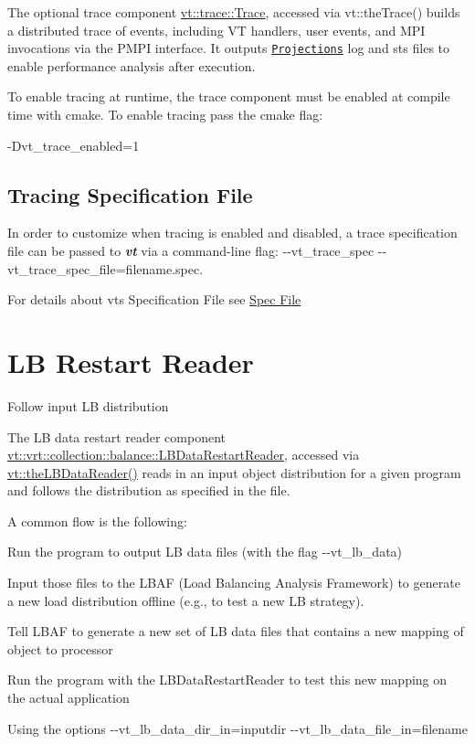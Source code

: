 The optional trace component {\ttfamily \hyperlink{structvt_1_1trace_1_1_trace}{vt\+::trace\+::\+Trace}}, accessed via {\ttfamily vt\+::the\+Trace()} builds a distributed trace of events, including VT handlers, user events, and M\+PI invocations via the P\+M\+PI interface. It outputs \href{http://charm.cs.uiuc.edu/software}{\tt Projections} log and sts files to enable performance analysis after execution.

To enable tracing at runtime, the trace component must be enabled at compile time with cmake. To enable tracing pass the cmake flag\+: 
\begin{DoxyCode}
-Dvt\_trace\_enabled=1
\end{DoxyCode}
\hypertarget{trace_tracing-spec-file}{}\subsection{Tracing Specification File}\label{trace_tracing-spec-file}
In order to customize when tracing is enabled and disabled, a trace specification file can be passed to {\bfseries {\itshape vt}} via a command-\/line flag\+: {\ttfamily -\/-\/vt\+\_\+trace\+\_\+spec -\/-\/vt\+\_\+trace\+\_\+spec\+\_\+file=filename.\+spec}.

For details about vt\textquotesingle{}s Specification File see \hyperlink{spec-file}{Spec File} \hypertarget{lb-data-reader}{}\section{LB Restart Reader}\label{lb-data-reader}
Follow input LB distribution

The LB data restart reader component {\ttfamily \hyperlink{structvt_1_1vrt_1_1collection_1_1balance_1_1_l_b_data_restart_reader}{vt\+::vrt\+::collection\+::balance\+::\+L\+B\+Data\+Restart\+Reader}}, accessed via {\ttfamily \hyperlink{namespacevt_a6dc000b04e41df77184588b50280b312}{vt\+::the\+L\+B\+Data\+Reader()}} reads in an input object distribution for a given program and follows the distribution as specified in the file.

A common flow is the following\+:
\begin{DoxyItemize}
\item Run the program to output LB data files (with the flag {\ttfamily -\/-\/vt\+\_\+lb\+\_\+data})
\item Input those files to the L\+B\+AF (Load Balancing Analysis Framework) to generate a new load distribution offline (e.\+g., to test a new LB strategy).
\begin{DoxyItemize}
\item Tell L\+B\+AF to generate a new set of LB data files that contains a new mapping of object to processor
\end{DoxyItemize}
\item Run the program with the {\ttfamily L\+B\+Data\+Restart\+Reader} to test this new mapping on the actual application
\begin{DoxyItemize}
\item Using the options {\ttfamily -\/-\/vt\+\_\+lb\+\_\+data\+\_\+dir\+\_\+in=inputdir -\/-\/vt\+\_\+lb\+\_\+data\+\_\+file\+\_\+in=filename} 
\end{DoxyItemize}
\end{DoxyItemize}